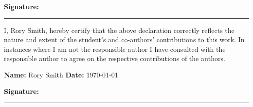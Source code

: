 {\textbf{Signature:}\\
\rule[1em]{25em}{0.5pt} 


I, Rory Smith, hereby certify that the above declaration correctly reflects the nature and extent of the student's and co-authors' contributions to this work. In instances where I am not the responsible author I have consulted with the responsible author to agree on the respective contributions of the authors.

\textbf{Name:} Rory Smith\hspace{5.6em} \textbf{Date:} \today

\textbf{Signature:}\\
\rule[1em]{25em}{0.5pt} 



}
